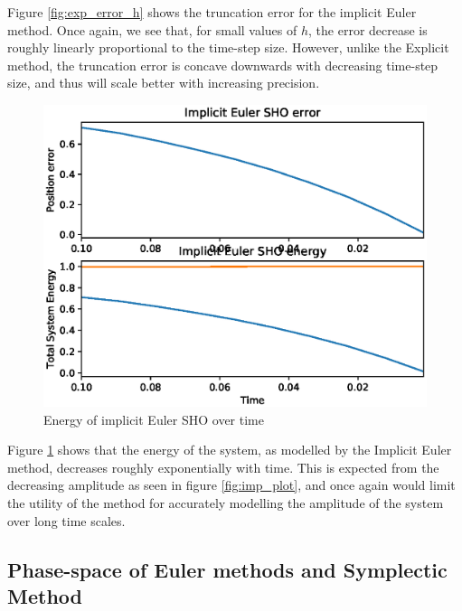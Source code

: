 \documentclass{article}
\begin{document}
Figure \ref{fig:exp_error_h} shows the truncation error for the implicit Euler method.  Once again, we see that, for small values of $h$, the error decrease is roughly linearly proportional to the time-step size.  However, unlike the Explicit method, the truncation error is concave downwards with decreasing time-step size, and thus will scale better with increasing precision.  

\newpage

\begin{figure}[h!]
\centering
\includegraphics[scale=0.75]{fig/implicit_energy.eps}
\caption{Energy of implicit Euler SHO over time}
\label{fig:imp_energy}
\end{figure}

Figure \ref{fig:imp_energy} shows that the energy of the system, as modelled by the Implicit Euler method, decreases roughly exponentially with time.  This is expected from the decreasing amplitude as seen in figure \ref{fig:imp_plot}, and once again would limit the utility of the method for accurately modelling the amplitude of the system over long time scales.  

\newpage

\subsection{Phase-space of Euler methods and Symplectic Method}
\end{document}
